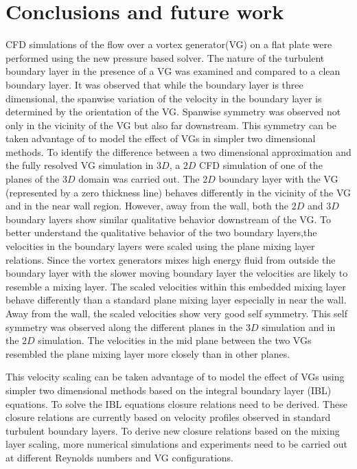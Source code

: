 \section{Conclusions and future work}\label{sec:future}
CFD simulations of the flow over a vortex generator(VG) on a flat plate were performed using the new pressure based solver. The nature of the turbulent boundary layer in the presence of a VG was examined and compared to a clean boundary layer. It was observed that while the boundary layer is three dimensional, the spanwise variation of the velocity in the boundary layer is determined by the orientation of the VG. Spanwise symmetry was observed not only in the vicinity of the VG but also far downstream. This symmetry can be taken advantage of to model the effect of VGs in simpler two dimensional methods. To identify the difference between a two dimensional approximation and the fully resolved VG simulation in $3D$, a $2D$ CFD simulation of one of the planes of the $3D$ domain was carried out. The $2D$ boundary layer with the VG (represented by a zero thickness line) behaves differently in the vicinity of the VG and in the near wall region. However, away from the wall, both the $2D$ and $3D$ boundary layers show similar qualitative behavior downstream of the VG. To better understand the qualitative behavior of the two boundary layers,the velocities in the boundary layers were scaled using the plane mixing layer relations. Since the vortex generators mixes high energy fluid from outside the boundary layer with the slower moving boundary layer the velocities are likely to resemble a mixing layer. The scaled velocities within this embedded mixing layer behave differently than a standard plane mixing layer especially in near the wall. Away from the wall, the scaled velocities show very good self symmetry. This self symmetry was observed along the different planes in the $3D$ simulation and in the $2D$ simulation. The velocities in the mid plane between the two VGs resembled the plane mixing layer more closely than in other planes.

This velocity scaling can be taken advantage of to model the effect of VGs using simpler two dimensional methods based on the integral boundary layer (IBL) equations. To solve the IBL equations closure relations need to be derived. These closure relations are currently based on velocity profiles observed in standard turbulent boundary layers. To derive new closure relations based on the mixing layer scaling, more numerical simulations and experiments need to be carried out at different Reynolds numbers and VG configurations.




